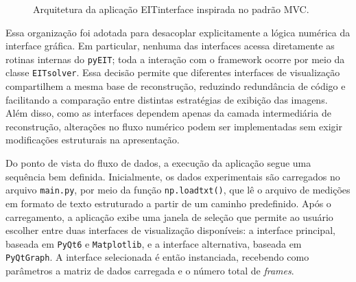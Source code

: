 \begin{figure}[H]
\caption{Arquitetura da aplicação EITinterface inspirada no padrão MVC.}
\label{fig:arquitetura_mvc}
\end{figure}

Essa organização foi adotada para desacoplar explicitamente a lógica numérica da interface gráfica. Em particular, nenhuma das interfaces acessa diretamente as rotinas internas do \texttt{pyEIT}; toda a interação com o framework ocorre por meio da classe \texttt{EITsolver}. Essa decisão permite que diferentes interfaces de visualização compartilhem a mesma base de reconstrução, reduzindo redundância de código e facilitando a comparação entre distintas estratégias de exibição das imagens. Além disso, como as interfaces dependem apenas da camada intermediária de reconstrução, alterações no fluxo numérico podem ser implementadas sem exigir modificações estruturais na apresentação.

Do ponto de vista do fluxo de dados, a execução da aplicação segue uma sequência bem definida. Inicialmente, os dados experimentais são carregados no arquivo \texttt{main.py}, por meio da função \texttt{np.loadtxt()}, que lê o arquivo de medições em formato de texto estruturado a partir de um caminho predefinido. Após o carregamento, a aplicação exibe uma janela de seleção que permite ao usuário escolher entre duas interfaces de visualização disponíveis: a interface principal, baseada em \texttt{PyQt6} e \texttt{Matplotlib}, e a interface alternativa, baseada em \texttt{PyQtGraph}. A interface selecionada é então instanciada, recebendo como parâmetros a matriz de dados carregada e o número total de \textit{frames}.

